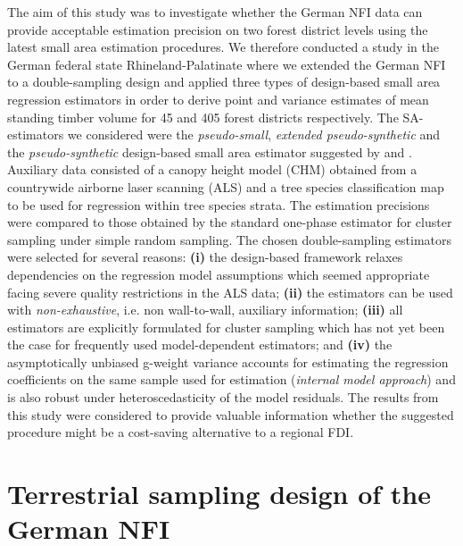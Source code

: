 The aim of this study was to investigate whether the German NFI data can provide acceptable estimation precision on two forest district levels using the latest small area estimation procedures. We therefore conducted a study in the German federal state Rhineland-Palatinate where we extended the German NFI to a double-sampling design and applied three types of design-based small area regression estimators in order to derive point and variance estimates of mean standing timber volume for 45 and 405 forest districts respectively. The SA-estimators we considered were the \textit{pseudo-small}, \textit{extended pseudo-synthetic} and the \textit{pseudo-synthetic} design-based small area estimator suggested by \citet{mandallaz2013a} and \citet{ mandallaz2013b}. Auxiliary data consisted of a canopy height model (CHM) obtained from a countrywide airborne laser scanning (ALS) and a tree species classification map to be used for regression within tree species strata. The estimation precisions were compared to those obtained by the standard one-phase estimator for cluster sampling under simple random sampling. The chosen double-sampling estimators were selected for several reasons: \textbf{(i)} the design-based framework relaxes dependencies on the regression model assumptions which seemed appropriate facing severe quality restrictions in the ALS data; \textbf{(ii)} the estimators can be used with \textit{non-exhaustive}, i.e. non wall-to-wall, auxiliary information; \textbf{(iii)} all estimators are explicitly formulated for cluster sampling which has not yet been the case for frequently used model-dependent estimators; and \textbf{(iv)} the asymptotically unbiased g-weight variance accounts for estimating the regression coefficients on the same sample used for estimation (\textit{internal model approach}) and is also robust under heteroscedasticity of the model residuals. The results from this study were considered to provide valuable information whether the suggested procedure might be a cost-saving alternative to a regional FDI.\par


\section{Terrestrial sampling design of the German NFI}
\label{sec:germanNFI}

